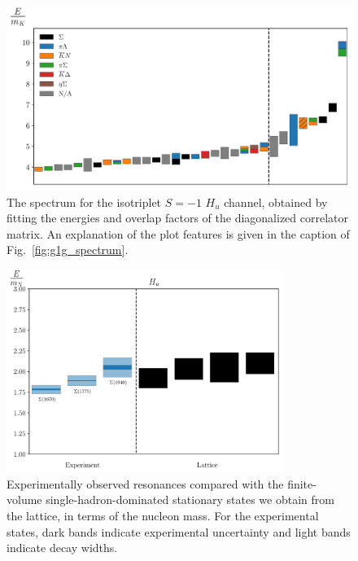 \begin{figure}[H]
    \centering
    \hspace*{-0.5in}\includegraphics[width=\textwidth]{figures/sigmas/hu/staircase_mk.pdf}
    \caption[The spectrum for the isotriplet $S=-1$ $H_u$ channel, obtained by fitting the energies and overlap factors of the diagonalized correlator matrix.]{The spectrum for the isotriplet $S=-1$ $H_u$ channel, obtained by fitting the energies and overlap factors of the diagonalized correlator matrix. An explanation of the plot features is given in the caption of Fig.~\ref{fig:g1g_spectrum}.}\label{fig:hu_spectrum}
\end{figure}

\begin{figure}[H]
    \centering
    \includegraphics[width=0.8\textwidth]{figures/sigmas/hu/expvslat.pdf}
    \caption[Experimentally observed resonances compared with the finite-volume single-hadron-dominated stationary states we obtain from the lattice in $H_u$, in terms of the nucleon mass.]{Experimentally observed resonances compared with the finite-volume single-hadron-dominated stationary states we obtain from the lattice, in terms of the nucleon mass. For the experimental states, dark bands indicate experimental uncertainty and light bands indicate decay widths.}\label{fig:hu_exp}
\end{figure}

